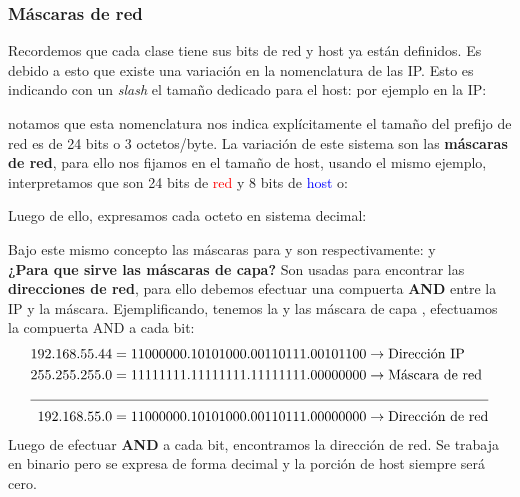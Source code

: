 \documentclass[
	12pt, %
	fleqn, %
	a4paper, %
]{LegrandOrangeBook}
\begin{document}
\subsubsection{Máscaras de red}
Recordemos que cada clase tiene sus bits de red y host ya están definidos. Es debido a esto que existe una variación en la nomenclatura de las IP. Esto es indicando con un \textit{slash} el  tamaño dedicado para el host: por ejemplo en la IP:\\
\begin{center}
\end{center}
notamos que esta nomenclatura nos indica explícitamente el tamaño del prefijo de red es de 24 bits o 3 octetos/byte. La variación de este sistema son las \textbf{máscaras de red}, para ello nos fijamos en el tamaño de host, usando el mismo ejemplo, interpretamos que son 24 bits de \textcolor{red}{red} y 8 bits de \textcolor{blue}{host} o:\\
\begin{center}
\ipAddress{\textcolor{red}{111111111111111111111111}\textcolor{blue}{00000000}}
\end{center}
Luego de ello, expresamos cada octeto en sistema decimal:\\
\begin{center}
\end{center}
Bajo este mismo concepto las máscaras para  y  son respectivamente:  y \\
\textbf{¿Para que sirve las máscaras de capa?} Son usadas para encontrar las \textbf{direcciones de red}, para ello debemos efectuar una compuerta \textbf{AND} entre la IP y la máscara. Ejemplificando, tenemos la  y las máscara de capa , efectuamos la compuerta AND a cada bit:\\
\begin{align*}
192.168.55.44&=11000000.10101000.00110111.00101100 \rightarrow\text{Dirección IP}\\
255.255.255.0&=11111111.11111111.11111111.00000000 \rightarrow\text{Máscara de red}\\
\cline{1-2}
192.168.55.0&=11000000.10101000.00110111.00000000 \rightarrow\text{Dirección de red}
\end{align*}
Luego de efectuar \textbf{AND} a cada bit, encontramos la dirección de red. Se trabaja en binario pero se expresa de forma decimal y la porción de host siempre será cero.
\end{document}
